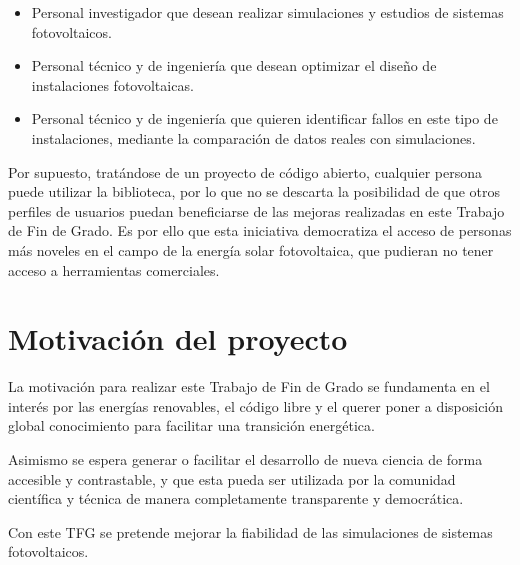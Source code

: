 \begin{itemize}

    \item Personal investigador que desean realizar simulaciones y estudios de sistemas fotovoltaicos.

    \item Personal técnico y de ingeniería que desean optimizar el diseño de instalaciones fotovoltaicas.

    \item Personal técnico y de ingeniería que quieren identificar fallos en este tipo de instalaciones, mediante la comparación de datos reales con simulaciones.

\end{itemize}

Por supuesto, tratándose de un proyecto de código abierto, cualquier persona puede utilizar la biblioteca, por lo que no se descarta la posibilidad de que otros perfiles de usuarios puedan beneficiarse de las mejoras realizadas en este Trabajo de Fin de Grado. Es por ello que esta iniciativa democratiza el acceso de personas más noveles en el campo de la energía solar fotovoltaica, que pudieran no tener acceso a herramientas comerciales.


\section{Motivación del proyecto} \label{sct:intro:motivacion}

La motivación para realizar este Trabajo de Fin de Grado se fundamenta en el interés por las energías renovables, el \gls{código libre} y el querer poner a disposición global conocimiento para facilitar una transición energética.

Asimismo se espera generar o facilitar el desarrollo de nueva ciencia de forma accesible y contrastable, y que esta pueda ser utilizada por la comunidad científica y técnica de manera completamente transparente y democrática.

Con este TFG se pretende mejorar la fiabilidad de las simulaciones de sistemas fotovoltaicos.


